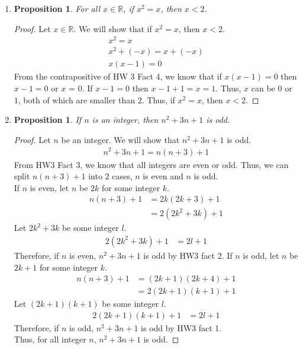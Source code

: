 \documentclass{article}
\newtheorem{prop}[thm]{Proposition}
\begin{document}
\begin{enumerate}
\item \begin{prop}
    For all $x \in \mathbb{R}$, if $x^2 = x$, then $x < 2$.
\end{prop}

\begin{proof}
Let $x \in \mathbb{R}$. We will show that if $x^2 = x$, then $x < 2$.
\begin{gather}
    x^2 = x \\
    x^2 + (-x) = x + (-x) \\
    x(x - 1) = 0
\end{gather}
From the contrapositive of HW 3 Fact 4, we know that if $x(x - 1) = 0$ then $x - 1 = 0$ or $x$ = 0. If $x - 1 = 0$ then $x - 1 + 1 = x = 1$. Thus, $x$ can be $0$ or $1$, both of which are smaller than $2$. Thus, if $x^2 = x$, then $x < 2$.
\end{proof}

\item \begin{prop}
     If $n$ is an integer, then $n^2 + 3n + 1$ is odd.
\end{prop}

\begin{proof}
Let $n$ be an integer. We will show that $n^2 + 3n + 1$ is odd.
\begin{gather}
    n^2 + 3n + 1 = n(n + 3) + 1
\end{gather}
From HW3 Fact 3, we know that all integers are even or odd. Thus, we can split $n(n + 3) + 1$ into $2$ cases, $n$ is even and $n$ is odd. \\
If $n$ is even, let $n$ be $2k$ for some integer $k$.
\begin{align}
    n(n + 3) + 1 &= 2k(2k + 3) + 1 \\
    &= 2(2k^2 + 3k) + 1
\end{align}
Let $2k^2 + 3k$ be some integer $l$.
\begin{align}
    2(2k^2 + 3k) + 1 &= 2l + 1
\end{align}
Therefore, if $n$ is even, $n^2 + 3n + 1$ is odd by HW3 fact 2.
If $n$ is odd, let $n$ be $2k + 1$ for some integer $k$.
\begin{align}
    n(n + 3) + 1 &= (2k + 1)(2k + 4) + 1 \\
    &= 2(2k + 1)(k + 1) + 1
\end{align}
Let $(2k + 1)(k + 1)$ be some integer $l$.
\begin{align}
    2(2k + 1)(k + 1) + 1 &= 2l + 1
\end{align}
Therefore, if $n$ is odd, $n^2 + 3n + 1$ is odd by HW3 fact 1. \\
Thus, for all integer $n$, $n^2 + 3n + 1$ is odd.
\end{proof}


\end{enumerate}
\end{document}
